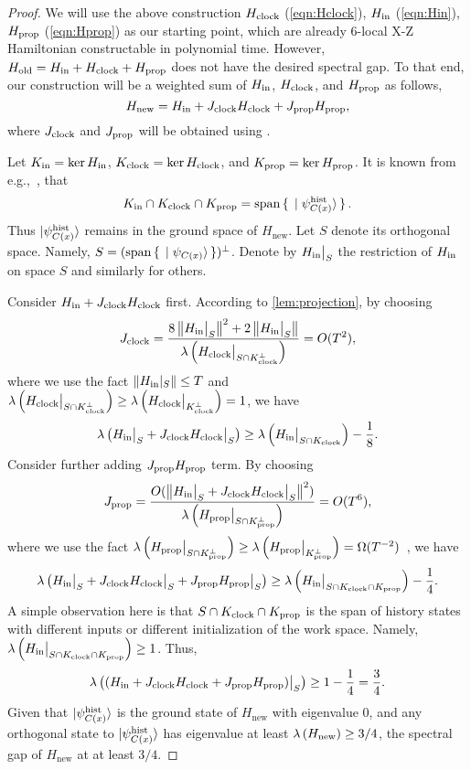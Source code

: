 \begin{proof}
We will use the above construction $H_{\mathrm{clock}}$ (\cref{eqn:Hclock}), $H_{\mathrm{in}}$ (\cref{eqn:Hin}), $H_{\mathrm{prop}}$ (\cref{eqn:Hprop}) as our starting point, which are already 6-local X-Z Hamiltonian constructable in polynomial time. However, $H_{\mathrm{old}}=H_{\mathrm{in}} + H_{\mathrm{clock}} + H_{\mathrm{prop}}$ does not have the desired spectral gap. To that end, our construction will be a weighted sum of $H_{\mathrm{in}}$, $H_{\mathrm{clock}}$, and $H_{\mathrm{prop}}$ as follows, 
\begin{equation}
    H_{\mathrm{new}}= H_{\mathrm{in}} + J_{\mathrm{clock}} H_{\mathrm{clock}} + J_{\mathrm{prop}} H_{\mathrm{prop}},
\end{equation}
where $J_{\mathrm{clock}}$ and $J_{\mathrm{prop}}$ will be obtained using . 

Let $K_{\mathrm{in}}=\ker H_{\mathrm{in}}$, $K_{\mathrm{clock}}=\ker H_{\mathrm{clock}}$, and $K_{\mathrm{prop}}=\ker H_{\mathrm{prop}}$. It is known from e.g.,~\cite{kitaev2002classical}, that 
\[
   K_{\mathrm{in}} \cap K_{\mathrm{clock}} \cap K_{\mathrm{prop}} = \operatorname*{\operatorname{span}}\set{\ket{\psi_{C(x)}^{\mathrm{hist}}}}.
\]
Thus $\ket{\psi_{C(x)}^{\mathrm{hist}}}$ remains in the ground space of $H_{\mathrm{new}}$. Let $S$ denote its orthogonal space. Namely, $S=(\operatorname*{\operatorname{span}}\set{\ket{\psi_{C(x)}}})^\bot$. 
Denote by $H_{\mathrm{in}}\big|_S$ the restriction of $H_{\mathrm{in}}$ on space $S$ and similarly for others. 

Consider $H_{\mathrm{in}} + J_{\mathrm{clock}}H_{\mathrm{clock}}$ first. According to \cref{lem:projection}, by choosing 
\[
  J_{\mathrm{clock}} = \frac{8\left\lVert H_{\mathrm{in}}\big|_S\right\rVert^2 + 2 \left\lVert H_{\mathrm{in}}\big|_S\right\rVert}{{\lambda \left (H_{\mathrm{clock}}\big|_{S\cap K_{\mathrm{clock}}^\bot} \right)}} = O(T^2),
\]
where we use the fact $\left\lVert H_{\mathrm{in}}|_S\right\rVert\leq T$ and ${\lambda \left (H_{\mathrm{clock}}\big|_{S\cap K_{\mathrm{clock}}^\bot} \right)}\geq {\lambda \left (H_{\mathrm{clock}}\big|_{K_{\mathrm{clock}}^\bot} \right)}=1$, 
we have 
\[
 {\lambda \left (H_{\mathrm{in}}\big|_S + J_{\mathrm{clock}}H_{\mathrm{clock}}\big|_S \right)}\geq {\lambda \left (H_{\mathrm{in}}\big|_{S\cap K_{\mathrm{clock}}} \right)} - \frac{1}{8}. 
\]
Consider further adding $J_{\mathrm{prop}}H_{\mathrm{prop}}$ term.  By choosing 
\[
 J_{\mathrm{prop}}= \frac{O(\left\lVert H_{\mathrm{in}}\big|_S + J_{\mathrm{clock}}H_{\mathrm{clock}}\big|_S\right\rVert^2)}{{\lambda \left (H_{\mathrm{prop}}\big|_{S \cap K_{\mathrm{prop}}^\bot} \right)}}= O(T^6),
\]
where we use the fact ${\lambda \left (H_{\mathrm{prop}}\big|_{S\cap K_{\mathrm{prop}}^\bot} \right)}\geq {\lambda \left (H_{\mathrm{prop}}\big|_{K_{\mathrm{prop}}^\bot} \right)}=\Omega(T^{-2})$~\cite{kitaev2002classical}, we have  
\[
 {\lambda \left (H_{\mathrm{in}}\big|_S + J_{\mathrm{clock}}H_{\mathrm{clock}}\big|_S + J_{\mathrm{prop}}H_{\mathrm{prop}}\big|_S \right)} \geq {\lambda \left (H_{\mathrm{in}}\big|_{S \cap K_{\mathrm{clock}}\cap K_{\mathrm{prop}}} \right)} - \frac{1}{4}. 
\]
A simple observation here is that $S \cap K_{\mathrm{clock}} \cap K_{\mathrm{prop}}$ is the span of history states with different inputs or different initialization of the work space. Namely, ${\lambda \left (H_{\mathrm{in}}\big|_{S \cap K_{\mathrm{clock}} \cap K_{\mathrm{prop}}} \right)} \geq 1$. Thus, 
\[
  {\lambda \left ((H_{\mathrm{in}} + J_{\mathrm{clock}}H_{\mathrm{clock}} + J_{\mathrm{prop}}H_{\mathrm{prop}})\big|_S \right)} \geq 1- \frac{1}{4}=\frac{3}{4}. 
\]
Given that $\ket{\psi_{C(x)}^{\mathrm{hist}}}$ is the ground state of $H_{\mathrm{new}}$ with eigenvalue 0, and any orthogonal state to $\ket{\psi_{C(x)}^{\mathrm{hist}}}$ has eigenvalue at least ${\lambda \left (H_{\mathrm{new}} \right)}\geq 3/4$, the spectral gap of $H_{\mathrm{new}}$ at at least $3/4$. 


\end{proof}
